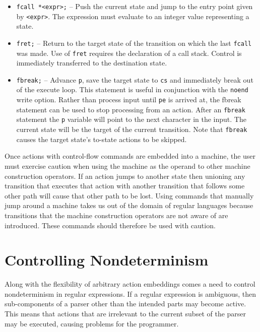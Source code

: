 \documentclass[letterpaper,11pt,oneside]{book}
\begin{document}
\begin{itemize}
\item \verb|fcall *<expr>;| -- Push the current state and jump to the entry
point given by \verb|<expr>|. The expression must evaluate to an integer value
representing a state.

\item \verb|fret;| -- Return to the target state of the transition on which the
last \verb|fcall| was made.  Use of \verb|fret| requires the declaration of a
call stack. Control is immediately transferred to the destination state.

\item \verb|fbreak;| -- Advance \verb|p|, save the target state to \verb|cs|
and immediately break out of the execute loop. This statement is useful
in conjunction with the \verb|noend| write option. Rather than process input
until \verb|pe| is arrived at, the fbreak statement
can be used to stop processing from an action.  After an \verb|fbreak|
statement the \verb|p| variable will point to the next character in the input. The
current state will be the target of the current transition. Note that \verb|fbreak|
causes the target state's to-state actions to be skipped.

\end{itemize}

 Once actions with control-flow commands are embedded into a
machine, the user must exercise caution when using the machine as the operand
to other machine construction operators. If an action jumps to another state
then unioning any transition that executes that action with another transition
that follows some other path will cause that other path to be lost. Using
commands that manually jump around a machine takes us out of the domain of
regular languages because transitions that the
machine construction operators are not aware of are introduced.  These
commands should therefore be used with caution.


\chapter{Controlling Nondeterminism}
\label{controlling-nondeterminism}

Along with the flexibility of arbitrary action embeddings comes a need to
control nondeterminism in regular expressions. If a regular expression is
ambiguous, then sub-components of a parser other than the intended parts may become
active. This means that actions that are irrelevant to the
current subset of the parser may be executed, causing problems for the
programmer.
\end{document}

